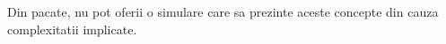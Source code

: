 
Din pacate, nu pot oferii o simulare care sa prezinte aceste concepte din cauza complexitatii
implicate.

